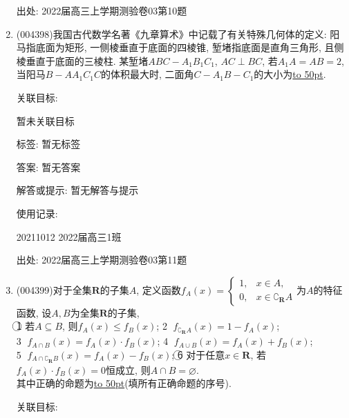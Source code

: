 \documentclass[10pt,a4paper]{article}
\newcommand{\blank}[1]{\underline{\hbox to #1pt{}}}
\begin{document}
\begin{enumerate}[1.]
出处: 2022届高三上学期测验卷03第10题
\item { (004398)}我国古代数学名著《九章算术》中记载了有关特殊几何体的定义: 阳马指底面为矩形, 一侧棱垂直于底面的四棱锥, 堑堵指底面是直角三角形, 且侧棱垂直于底面的三棱柱. 某堑堵$ABC-A_1B_1C_1$, $AC\perp BC$, 若$A_1A=AB=2$, 当阳马$B-AA_1C_1C$的体积最大时, 二面角$C-A_1B-C_1$的大小为\blank{50}.
\begin{center}
\end{center}


关联目标:

暂未关联目标



标签: 暂无标签

答案: 暂无答案

解答或提示: 暂无解答与提示

使用记录:

20211012	2022届高三1班	


出处: 2022届高三上学期测验卷03第11题
\item { (004399)}对于全集$\mathbf{R}$的子集$A$, 定义函数$f_A(x)=\begin{cases}
1, &  x\in A,  \\0, & x\in \complement_{\mathbf{R}}A  \end{cases}$为$A$的特征函数, 设$A,B$为全集$\mathbf{R}$的子集,\\
\textcircled{1} 若$A\subseteq B$, 则$f_A(x)\le f_B(x)$; \textcircled{2} $f_{\complement_{\mathbf{R}}A}(x)=1-f_A(x)$;\\
\textcircled{3} ${f_{A\cap B}}(x)=f_A(x)\cdot f_B(x)$; \textcircled{4} $f_{A\cup B}(x)=f_A(x)+f_B(x)$;\\ \textcircled{5} $f_{A\cap \complement_\mathbf{R}B}(x)=f_A(x)-f_B(x)$; \textcircled{6} 对于任意$x\in \mathbf{R}$, 若$f_A(x)\cdot f_B(x)=0$恒成立, 则$A\cap B=\varnothing$.\\
其中正确的命题为\blank{50}(填所有正确命题的序号).


关联目标:


\end{enumerate}
\end{document}
